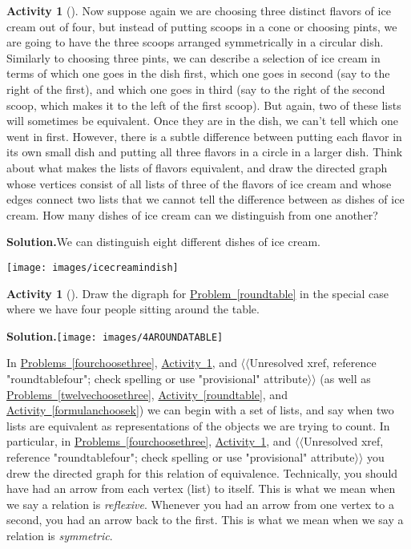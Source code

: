 \documentclass[10pt,]{book}
\theoremstyle{plain}
\theoremstyle{definition}
\newtheorem{activity}[project]{Activity}
\numberwithin{equation}{chapter}
\begin{document}
\begin{activity}[]\label{icecreaminadish}
Now suppose again we are choosing three distinct flavors of ice cream out of four, but instead of putting scoops in a cone or choosing pints, we are going to have the three scoops arranged symmetrically in a circular dish. Similarly to choosing three pints, we can describe a selection of ice cream in terms of which one goes in the dish first, which one goes in second (say to the right of the first), and which one goes in third (say to the right of the second scoop, which makes it to the left of the first scoop). But again, two of these lists will sometimes be equivalent. Once they are in the dish, we can't tell which one went in first. However, there is a subtle difference between putting each flavor in its own small dish and putting all three flavors in a circle in a larger dish. Think about what makes the lists of flavors equivalent, and draw the directed graph whose vertices consist of all lists of three of the flavors of ice cream and whose edges connect two lists that we cannot tell the difference between as dishes of ice cream. How many dishes of ice cream can we distinguish from one another?%
\par\medskip\noindent%
\textbf{Solution.}\quad We can distinguish eight different dishes of ice cream.%
\par
\texttt{[image: images/icecreamindish]}
%
\end{activity}
\begin{activity}[]\label{activity-325}
Draw the digraph for \hyperref[roundtable]{Problem~\ref{roundtable}} in the special case where we have four people sitting around the table.%
\par\medskip\noindent%
\textbf{Solution.}\quad \texttt{[image: images/4AROUNDATABLE]}
\end{activity}
In \hyperref[fourchoosethree]{Problems~\ref{fourchoosethree}}, \hyperref[icecreaminadish]{Activity~\ref{icecreaminadish}}, and {$\langle\langle$Unresolved xref, reference "roundtablefour"; check spelling or use "provisional" attribute$\rangle\rangle$} (as well as \hyperref[twelvechoosethree]{Problems~\ref{twelvechoosethree}}, \hyperref[roundtable]{Activity~\ref{roundtable}}, and \hyperref[formulanchoosek]{Activity~\ref{formulanchoosek}}) we can begin with a set of lists, and say when two lists are equivalent as representations of the objects we are trying to count. In particular, in \hyperref[fourchoosethree]{Problems~\ref{fourchoosethree}}, \hyperref[icecreaminadish]{Activity~\ref{icecreaminadish}}, and {$\langle\langle$Unresolved xref, reference "roundtablefour"; check spelling or use "provisional" attribute$\rangle\rangle$} you drew the directed graph for this relation of equivalence. Technically, you should have had an arrow from each vertex (list) to itself. This is what we mean when we say a relation is \emph{reflexive}. Whenever you had an arrow from one vertex to a second, you had an arrow back to the first. This is what we mean when we say a relation is \emph{symmetric}.%
\end{document}
